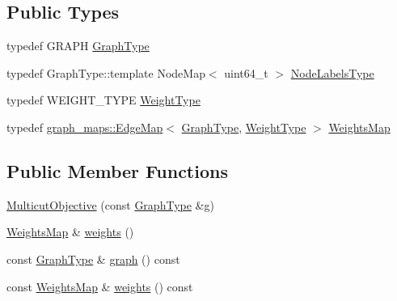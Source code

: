 \subsection*{Public Types}
\begin{DoxyCompactItemize}
\item 
typedef G\+R\+A\+PH \hyperlink{classnifty_1_1graph_1_1opt_1_1multicut_1_1MulticutObjective_a542786fae244388460be05f98396f864}{Graph\+Type}
\item 
typedef Graph\+Type\+::template Node\+Map$<$ uint64\+\_\+t $>$ \hyperlink{classnifty_1_1graph_1_1opt_1_1multicut_1_1MulticutObjective_ade78c0dcabc90473c11c36dcbed3c157}{Node\+Labels\+Type}
\item 
typedef W\+E\+I\+G\+H\+T\+\_\+\+T\+Y\+PE \hyperlink{classnifty_1_1graph_1_1opt_1_1multicut_1_1MulticutObjective_a958d4c547cb186fb4d7af5e664027a16}{Weight\+Type}
\item 
typedef \hyperlink{structnifty_1_1graph_1_1graph__maps_1_1EdgeMap}{graph\+\_\+maps\+::\+Edge\+Map}$<$ \hyperlink{classnifty_1_1graph_1_1opt_1_1multicut_1_1MulticutObjective_a542786fae244388460be05f98396f864}{Graph\+Type}, \hyperlink{classnifty_1_1graph_1_1opt_1_1multicut_1_1MulticutObjective_a958d4c547cb186fb4d7af5e664027a16}{Weight\+Type} $>$ \hyperlink{classnifty_1_1graph_1_1opt_1_1multicut_1_1MulticutObjective_aa893b1c13cb7add0c87445a1ed24d214}{Weights\+Map}
\end{DoxyCompactItemize}
\subsection*{Public Member Functions}
\begin{DoxyCompactItemize}
\item 
\hyperlink{classnifty_1_1graph_1_1opt_1_1multicut_1_1MulticutObjective_aea34e2cb5314dab5a6aa51c0a0eca336}{Multicut\+Objective} (const \hyperlink{classnifty_1_1graph_1_1opt_1_1multicut_1_1MulticutObjective_a542786fae244388460be05f98396f864}{Graph\+Type} \&g)
\item 
\hyperlink{classnifty_1_1graph_1_1opt_1_1multicut_1_1MulticutObjective_aa893b1c13cb7add0c87445a1ed24d214}{Weights\+Map} \& \hyperlink{classnifty_1_1graph_1_1opt_1_1multicut_1_1MulticutObjective_a8789c71e5f2591ab17dc56a90e6a0f6e}{weights} ()
\item 
const \hyperlink{classnifty_1_1graph_1_1opt_1_1multicut_1_1MulticutObjective_a542786fae244388460be05f98396f864}{Graph\+Type} \& \hyperlink{classnifty_1_1graph_1_1opt_1_1multicut_1_1MulticutObjective_a77da7e88d6b4818554de5b30a6b21bf1}{graph} () const
\item 
const \hyperlink{classnifty_1_1graph_1_1opt_1_1multicut_1_1MulticutObjective_aa893b1c13cb7add0c87445a1ed24d214}{Weights\+Map} \& \hyperlink{classnifty_1_1graph_1_1opt_1_1multicut_1_1MulticutObjective_a3f97ef87873adce4123c49c87a9ecc6f}{weights} () const
\end{DoxyCompactItemize}


